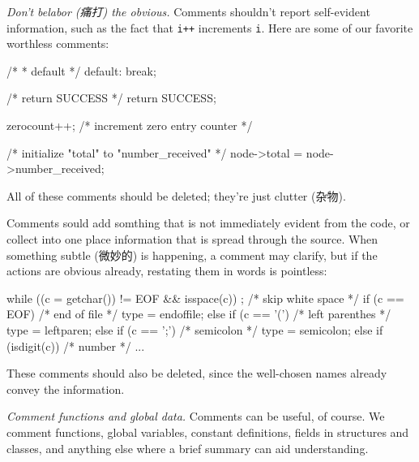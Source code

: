 \emph{Don't belabor (痛打) the obvious.} Comments shouldn't report
self-evident information, such as the fact that \verb'i++' increments
\verb'i'. Here are some of our favorite worthless comments:
\begin{badcode}
    /* 
     * default 
     */
    default:
        break;
\end{badcode}
\begin{badcode}
    /* return SUCCESS */
    return SUCCESS;
\end{badcode}
\begin{badcode}
    zerocount++;    /* increment zero entry counter */
\end{badcode}
\begin{badcode}
    /* initialize "total" to "number_received" */
    node->total = node->number_received;
\end{badcode}
All of these comments should be deleted; they're just clutter (杂物).

Comments sould add somthing that is not immediately evident from the code,
or collect into one place information that is spread through the source.
When something subtle (微妙的) is happening, a comment may clarify, but if
the actions are obvious already, restating them in words is pointless:
\begin{badcode}
    while ((c = getchar()) != EOF && isspace(c))
        ;   /* skip white space */
    if (c == EOF)   /* end of file */
        type = endoffile;
    else if (c == '(')  /* left parenthes */
        type = leftparen;
    else if (c == ';')  /* semicolon */
        type = semicolon;
    else if (isdigit(c))    /* number */
        ...
\end{badcode}
These comments should also be deleted, since the well-chosen names already
convey the information.

\emph{Comment functions and global data.} Comments can be useful, of
course. We comment functions, global variables, constant definitions,
fields in structures and classes, and anything else where a brief summary
can aid understanding.

